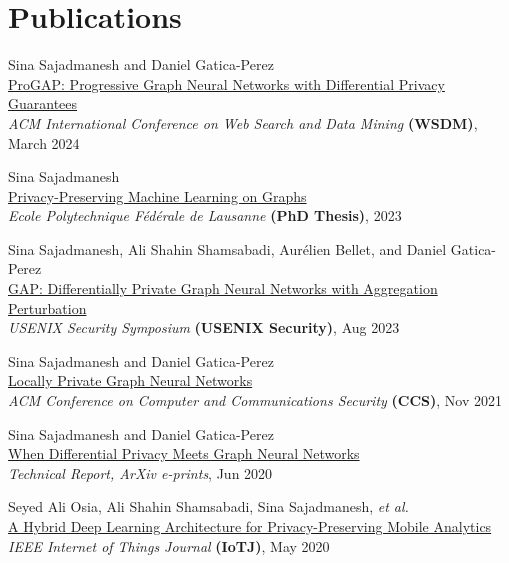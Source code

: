 \documentclass[11pt]{article}
\begin{document}
\section{Publications}

\begin{outerlist}

	\item {Sina Sajadmanesh} and Daniel Gatica-Perez\\
	\href{https://dl.acm.org/doi/10.1145/3616855.3635761}{{ProGAP: Progressive Graph Neural Networks with Differential Privacy Guarantees}}\\
	\textit{ACM International Conference on Web Search and Data Mining
  } \textbf{(WSDM)}, March 2024

  \item {Sina Sajadmanesh}\\
	\href{https://infoscience.epfl.ch/record/306602}{{Privacy-Preserving Machine Learning on Graphs}}\\
	\textit{Ecole Polytechnique Fédérale de Lausanne} \textbf{(PhD Thesis)}, 2023

	\item {Sina Sajadmanesh}, Ali Shahin Shamsabadi, Aurélien Bellet, and Daniel Gatica-Perez\\
	\href{https://www.usenix.org/conference/usenixsecurity23/presentation/sajadmanesh}{{GAP: Differentially Private Graph Neural Networks with Aggregation Perturbation}}\\
	\textit{USENIX Security Symposium }\textbf{(USENIX Security)}, Aug 2023

	\item {Sina Sajadmanesh} and Daniel Gatica-Perez\\
	\href{https://dl.acm.org/doi/abs/10.1145/3460120.3484565}{{Locally Private Graph Neural Networks}}\\
	\textit{ACM Conference on Computer and Communications Security }\textbf{(CCS)}, Nov 2021

  \item {Sina Sajadmanesh} and Daniel Gatica-Perez\\
	\href{https://arxiv.org/abs/2006.05535v3}{{When Differential Privacy Meets Graph Neural Networks}}\\
	\textit{Technical Report, ArXiv e-prints}, Jun 2020

	\item Seyed Ali Osia, Ali Shahin Shamsabadi, {Sina Sajadmanesh}, \textit{et al.}\\
	\href{https://ieeexplore.ieee.org/document/8962332}{{A Hybrid Deep Learning Architecture for Privacy-Preserving Mobile Analytics}}\\
	\textit{IEEE Internet of Things Journal} \textbf{(IoTJ)}, May 2020


\end{outerlist}
\end{document}
